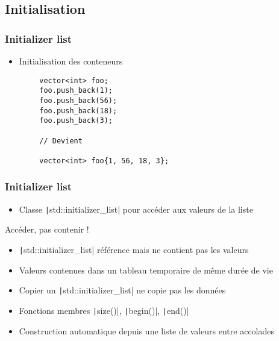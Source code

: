 \documentclass[C++.tex]{subfiles}
\begin{document}
\subsection*{Initialisation}
\begin{frame}[fragile]
	\frametitle{Initializer list}
	\begin{itemize}
		\item Initialisation des conteneurs
	\end{itemize}

	\begin{verbatim}
		vector<int> foo;
		foo.push_back(1);
		foo.push_back(56);
		foo.push_back(18);
		foo.push_back(3);

		// Devient

		vector<int> foo{1, 56, 18, 3};
	\end{verbatim}
\end{frame}

\begin{frame}[fragile]
	\frametitle{Initializer list}
	\begin{itemize}
		\item Classe \texttt|std::initializer_list| pour accéder aux valeurs de la liste
	\end{itemize}

	\begin{alertblock}{Accéder, pas contenir !}
		\begin{itemize}
			\item \texttt|std::initializer_list| référence mais ne contient pas les valeurs
			\item Valeurs contenues dans un tableau temporaire de même durée de vie
			\item Copier un \texttt|std::initializer_list| ne copie pas les données
		\end{itemize}
	\end{alertblock}		

	\begin{itemize}
		\item Fonctions membres \texttt|size()|, \texttt|begin()|, \texttt|end()|
		\item Construction automatique depuis une liste de valeurs entre accolades
	\end{itemize}
\end{frame}
\end{document}
